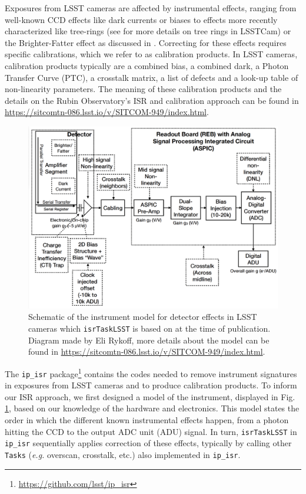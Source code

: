 Exposures from LSST cameras are affected by instrumental effects, ranging from well-known CCD effects like dark currents or biases to effects more recently characterized like tree-rings (see \cite{park_properties_2017,park_tree_2020,esteves_photometry_2023} for more details on tree rings in LSSTCam) or the Brighter-Fatter effect as discussed in \cite{broughton_2023}. Correcting for these effects requires specific calibrations, which we refer to as calibration products. In LSST cameras, calibration products typically are a combined bias, a combined dark, a Photon Transfer Curve (PTC), a crosstalk matrix, a list of defects and a look-up table of non-linearity parameters.
The meaning of these calibration products and the details on the Rubin Observatory's ISR and calibration approach can be found in \url{https://sitcomtn-086.lsst.io/v/SITCOM-949/index.html}.
\begin{figure}[h!]
    \centering
\includegraphics[scale=0.25]{isr_plots/instrumentmodel_isr.png}
    \caption{Schematic of the instrument model for detector effects in LSST cameras which \texttt{isrTaskLSST} is based on at the time of publication. Diagram made by Eli Rykoff, more details about the model can be found in \url{https://sitcomtn-086.lsst.io/v/SITCOM-949/index.html}.}
    \label{fig:isr_model}
\end{figure}

The \texttt{ip\_isr} package\footnote{\url{https://github.com/lsst/ip_isr}} contains the codes needed to remove instrument signatures in exposures from LSST cameras and to produce calibration products.
To inform our ISR approach, we first designed a model of the instrument, displayed in Fig. \ref{fig:isr_model}, based on our knowledge of the hardware and electronics. This model states the order in which the different known instrumental effects happen, from a photon hitting the CCD to the output ADC unit (ADU) signal.
In turn, \texttt{isrTaskLSST} in \texttt{ip\_isr} sequentially applies correction of these effects, typically by calling other \texttt{Tasks} (\textit{e.g.} overscan, crosstalk, etc.) also implemented in \texttt{ip\_isr}.





